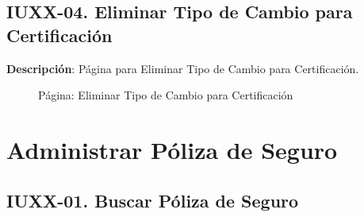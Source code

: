 \clearpage
\subsection{IUXX-04. Eliminar Tipo de Cambio para Certificación} \label{sec:ui-page-delete-tipocambiocertificacion}

\textbf{Descripción}: Página para Eliminar Tipo de Cambio para Certificación.\\

\begin{figure}[H]
	\label{tab:ui-delete-tipocambiocertificacion-page}
	\caption{Página: Eliminar Tipo de Cambio para Certificación}
\end{figure}

\begin{table}[H]
	\caption{Forma: Eliminar Tipo de Cambio para Certificación}
	\label{tab:ui-delete-tipocambiocertificacion-form}
\end{table}



\clearpage
\section{Administrar Póliza de Seguro} \label{sec:cf-ui-admin-polizaseguro}

\subsection{IUXX-01. Buscar Póliza de Seguro} \label{sec:ui-page-search-polizaseguro}

